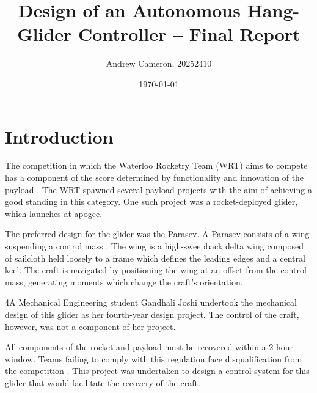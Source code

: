 \documentclass{sydeStyle}
\title{
Design of an Autonomous Hang-Glider Controller -- Final Report
}
\date{\today}
\author{Andrew Cameron, 20252410}
\begin{document}

\maketitle

\tableofcontents

\chapter{Introduction}

The competition in which the Waterloo Rocketry Team (WRT) aims to compete has a
component of the score determined by functionality and innovation of the
payload \cite{IREC}. The WRT spawned several payload projects with the aim of
achieving a good standing in this category. One such project was a
rocket-deployed glider, which launches at apogee.

The preferred design for the glider was the Parasev. A Parasev consists of a
wing suspending a control mass \cite{wiki:parasev}. The wing is a high-sweepback
delta wing composed of sailcloth held loosely to a frame which defines the
leading edges and a central keel. The craft is navigated by positioning the wing
at an offset from the control mass, generating moments which change the craft's
orientation.

4A Mechanical Engineering student Gandhali Joshi undertook the mechanical
design of this glider as her fourth-year design project. The control of the
craft, however, was not a component of her project.

All components of the rocket and payload must be recovered within a 2 hour
window. Teams failing to comply with this regulation face disqualification from
the competition \cite{IREC}. This project was undertaken to design a control
system for this glider that would facilitate the recovery of the craft.
\end{document}
